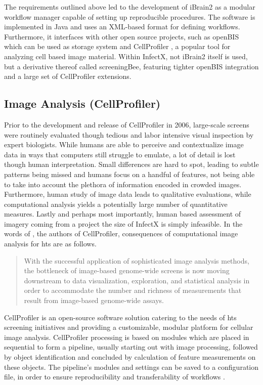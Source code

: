 The requirements outlined above led to the development of iBrain2 as a modular workflow manager capable of setting up reproducible procedures. The software is implemented in Java and uses an XML-based format for defining workflows. Furthermore, it interfaces with other open source projects, such as openBIS \citep{Bauch2011} which can be used as storage system and CellProfiler \citep{Carpenter2006,Kamentsky2011}, a popular tool for analyzing cell based image material. Within InfectX, not iBrain2 itself is used, but a derivative thereof called screeningBee, featuring tighter openBIS integration and a large set of CellProfiler extensions.

\subsection{Image Analysis (CellProfiler)}
Prior to the development and release of CellProfiler in 2006, large-scale screens were routinely evaluated though tedious and labor intensive visual inspection by expert biologists. While humans are able to perceive and contextualize image data in ways that computers still struggle to emulate, a lot of detail is lost though human interpretation. Small differences are hard to spot, leading to subtle patterns being missed and humans focus on a handful of features, not being able to take into account the plethora of information encoded in crowded images. Furthermore, human study of image data leads to qualitative evaluations, while computational analysis yields a potentially large number of quantitative measures. Lastly and perhaps most importantly, human based assessment of imagery coming from a project the size of InfectX is simply infeasible. In the words of \citeauthor{Carpenter2006}, the authors of CellProfiler, consequences of computational image analysis for \gls{hts} are as follows.

\begin{quote}
With the successful application of sophisticated image analysis methods, the bottleneck of image-based genome-wide screens is now moving downstream to data visualization, exploration, and statistical analysis in order to accommodate the number and richness of measurements that result from image-based genome-wide assays.
\end{quote}

CellProfiler is an open-source software solution catering to the needs of \gls{hts} screening initiatives and providing a customizable, modular platform for cellular image analysis. CellProfiler processing is based on modules which are placed in sequential to form a pipeline, usually starting out with image processing, followed by object identification and concluded by calculation of feature measurements on these objects. The pipeline's modules and settings can be saved to a configuration file, in order to ensure reproducibility and transferability of workflows \citep{Carpenter2006}.

